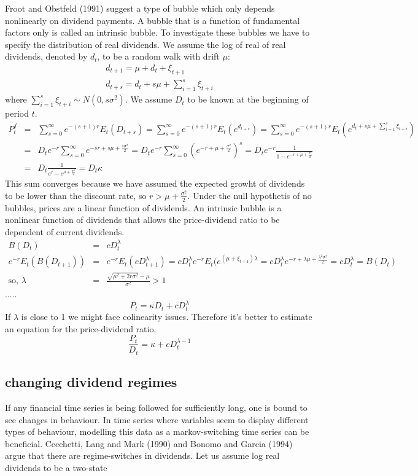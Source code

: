 \documentclass{article}
\begin{document}
Froot and Obstfeld (1991) suggest a type of bubble which only depends nonlinearly on dividend payments. A bubble that is a function of fundamental factors only is called an intrinsic bubble. To investigate these bubbles we have to specify the distribution of real dividends. We assume the log of real of real dividends, denoted by $d_t$, to be a random walk with drift $\mu$: 
\begin{eqnarray}
d_{t+1} = \mu + d_t + \xi_{t+1} \label{lognormal} \\
d_{t+s} = d_t + s\mu + \sum_{i=1}^{s} \xi_{t+i}
\end{eqnarray}
where $\sum_{i=1}^{s} \xi_{t+i} \sim N(0,s\sigma^2)$. We assume $D_t$ to be known at the beginning of period $t$.
\begin{eqnarray}
P_t^f &=&  \sum_{s=0}^{\infty}e^{-(s+1)r}E_t(D_{t+s}) = \sum_{s=0}^{\infty}e^{-(s+1)r}E_t(e^{d_{t+s}}) = \sum_{s=0}^{\infty}e^{-(s+1)r}E_t(e^{d_t + s\mu + \sum_{i=1}^{s} \xi_{t+i}}) \\
 &=& D_t e^{-r} \sum_{s=0}^{\infty} e^{-sr + s\mu + \frac{s\sigma^2}{2}} = D_t e^{-r} \sum_{s=0}^{\infty} \left(e^{-r + \mu + \frac{\sigma^2}{2}}\right)^s
 = D_t e^{-r} \frac{1}{1 - e^{-r + \mu + \frac{\sigma^2}{2}}} \\ 
 &=& D_t \frac{1}{e^r - e^{\mu + \frac{\sigma^2}{2}}} = D_t \kappa
\end{eqnarray}
This sum converges because we have assumed the expected growht of dividends to be lower than the discount rate, so $r > \mu + \frac{\sigma^2}{2}$. Under the null hypothetis of no bubbles, prices are a linear function of dividends. An intrinsic bubble is a nonlinear function of dividends that  allows the price-dividend ratio to be dependent of current dividends. 
\begin{eqnarray} 
B(D_t) &=& cD_t^{\lambda} \\
e^{-r}E_t(B(D_{t+1})) &=& e^{-r}E_t(cD_{t+1}^{\lambda}) =  cD_t^{\lambda}e^{-r}E_t(e^{(\mu + \xi_{t+1})\lambda} = cD_t^{\lambda}e^{-r + \lambda \mu + \frac{\lambda^2 \sigma^2}{2}} = cD_t^{\lambda} = B(D_t) \\
\text{so,  }\lambda &=& \frac{\sqrt{\mu^2 + 2r\sigma^2} - \mu}{\sigma^2} > 1
\end{eqnarray}
.....
$$P_t = \kappa D_t + cD_t^{\lambda}$$
If $\lambda$ is close to 1 we might face colinearity issues. Therefore it's better to estimate an equation for the price-dividend ratio.
$$\frac{P_t}{D_t} = \kappa + cD_t^{\lambda - 1}$$


\subsection{changing dividend regimes}
If any financial time series is being followed for sufficiently long, one is bound to see changes in behaviour. 
In time series where variables seem to display different types of behaviour, modelling this data as a markov-switching time series can be beneficial. Cecchetti, Lang and Mark (1990) and Bonomo and Garcia (1994) argue that there are regime-switches in dividends. Let us assume log real dividends to be a two-state 
\end{document}
